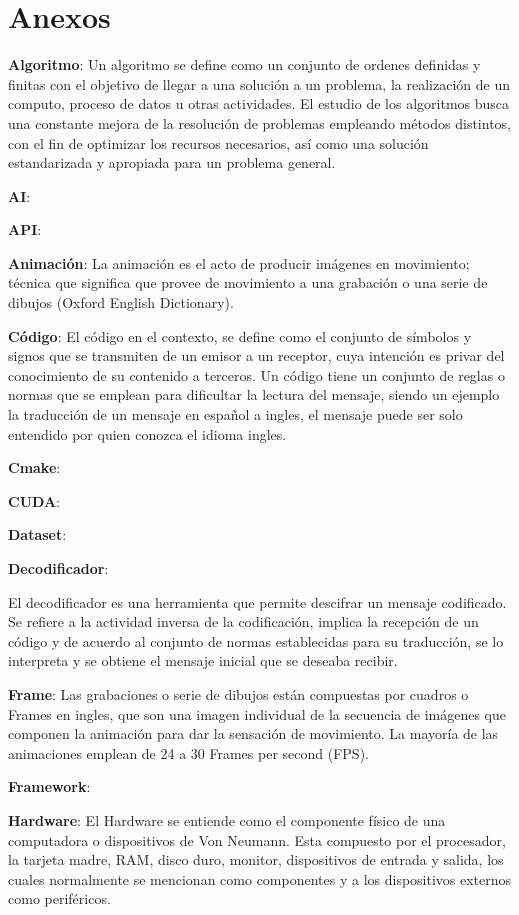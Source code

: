 \chapter{Anexos}



\textbf{Algoritmo}: Un algoritmo se define como un conjunto de ordenes definidas y finitas con el objetivo de llegar a una solución a un problema, la realización de un computo, proceso de datos u otras actividades. El estudio de los algoritmos busca una constante mejora de la resolución de problemas empleando métodos distintos, con el fin de optimizar los recursos necesarios, así como una solución estandarizada y apropiada para un problema general.

\textbf{AI}:

\textbf{API}:

\textbf{Animación}: La animación es el acto de producir imágenes en movimiento; técnica que significa que provee de movimiento a una grabación o una serie de dibujos (Oxford English Dictionary). 

\textbf{Código}: El código en el contexto, se define como el conjunto de símbolos y signos que se transmiten de un emisor a un receptor, cuya intención es privar del conocimiento de su contenido a terceros. Un código tiene un conjunto de reglas o normas que se emplean para dificultar la lectura del mensaje, siendo un ejemplo la traducción de un mensaje en español a ingles, el mensaje puede ser solo entendido por quien conozca el idioma ingles.

\textbf{Cmake}:

\textbf{CUDA}:

\textbf{Dataset}:

\textbf{Decodificador}:

El decodificador es una herramienta que permite descifrar un mensaje codificado. Se refiere a la actividad inversa de la codificación, implica la recepción de un código y de acuerdo al conjunto de normas establecidas para su traducción, se lo interpreta y se obtiene el mensaje inicial que se deseaba recibir.

\textbf{Frame}:
Las grabaciones o serie de dibujos están compuestas por cuadros o Frames en ingles, que son una imagen individual de la secuencia de imágenes que componen la animación para dar la sensación de movimiento. La mayoría de las animaciones emplean de 24 a 30 Frames per second (FPS). 

\textbf{Framework}:

\textbf{Hardware}: El Hardware se entiende como el componente físico de una computadora o dispositivos de Von Neumann. Esta compuesto por el procesador, la tarjeta madre, RAM, disco duro, monitor, dispositivos de entrada y salida, los cuales normalmente se mencionan como componentes y a los dispositivos externos como periféricos\cite{hardwaredef}.

